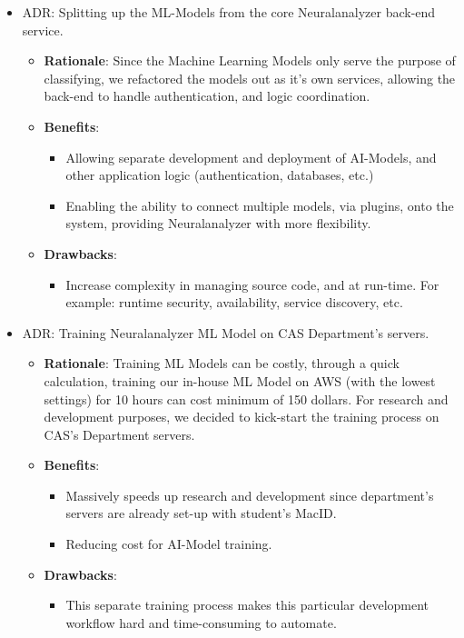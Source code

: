 \documentclass[12pt]{article}
\newcounter{adrnum} %
\begin{document}
\begin{itemize}
    \item ADR\theadrnum \label{ADR_splitting_AI_from_backend}: Splitting up the ML-Models from the core Neuralanalyzer back-end service.
    \begin{itemize}
        \item \textbf{Rationale}: Since the Machine Learning Models only serve the purpose of classifying, we refactored the models out as it's own services, allowing the back-end to handle authentication, and logic coordination.
        \item \textbf{Benefits}:
        \begin{itemize}
            \item Allowing separate development and deployment of AI-Models, and other application logic (authentication, databases, etc.)
            \item Enabling the ability to connect multiple models, via plugins, onto the system, providing Neuralanalyzer with more flexibility.
        \end{itemize}
        \item \textbf{Drawbacks}:
        \begin{itemize}
            \item Increase complexity in managing source code, and at run-time. For example: runtime security, availability, service discovery, etc.
        \end{itemize}
    \end{itemize}
    
    \item ADR\theadrnum \label{ADR_train_on_cas}: Training Neuralanalyzer ML Model on CAS Department's servers.
    \begin{itemize}
        \item \textbf{Rationale}: Training ML Models can be costly, through a quick calculation, training our in-house ML Model on AWS (with the lowest settings) for 10 hours can cost minimum of 150 dollars. For research and development purposes, we decided to kick-start the training process on CAS's Department servers.
        \item \textbf{Benefits}:
        \begin{itemize}
            \item Massively speeds up research and development since department's servers are already set-up with student's MacID.
            \item Reducing cost for AI-Model training.
        \end{itemize}
        \item \textbf{Drawbacks}:
        \begin{itemize}
            \item This separate training process makes this particular development workflow hard and time-consuming to automate.
        \end{itemize}
    \end{itemize}
    

\end{itemize}
\end{document}
